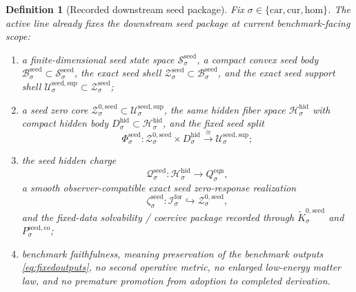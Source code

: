 \documentclass[11pt]{article}
\newcommand{\Car}{\mathrm{car}}
\newcommand{\Cur}{\mathrm{cur}}
\newcommand{\Hom}{\mathrm{hom}}
\newcommand{\ForSpace}[1]{\mathcal I_{#1}^{\mathrm{for}}}
\newcommand{\EqnTarget}[1]{Q_{#1}^{\mathrm{eqn}}}
\newcommand{\HiddenSpace}[1]{\mathcal H_{#1}^{\mathrm{hid}}}
\newcommand{\HiddenBody}[1]{D_{#1}^{\mathrm{hid}}}
\newcommand{\SeedState}[1]{\mathcal S_{#1}^{\mathrm{seed}}}
\newcommand{\SeedBody}[1]{\mathcal B_{#1}^{\mathrm{seed}}}
\newcommand{\SeedShell}[1]{\mathcal Z_{#1}^{\mathrm{seed}}}
\newcommand{\SeedSupportShell}[1]{\mathcal U_{#1}^{\mathrm{seed,sup}}}
\newcommand{\SeedZeroCore}[1]{\mathcal Z_{#1}^{0,\mathrm{seed}}}
\newcommand{\SeedSplit}[1]{\Phi_{#1}^{\mathrm{seed}}}
\newcommand{\SeedCharge}[1]{\mathcal Q_{#1}^{\mathrm{seed}}}
\newcommand{\SeedEmbed}[1]{\zeta_{#1}^{\mathrm{seed}}}
\newcommand{\SeedKernel}[1]{\widetilde K_{#1}^{0,\mathrm{seed}}}
\newcommand{\SeedCoercive}[1]{P_{#1}^{\mathrm{seed,co}}}
\newtheorem{definition}{Definition}
\begin{document}
\begin{definition}[Recorded downstream seed package]
\label{def:seed}
Fix \(\sigma\in\{\Car,\Cur,\Hom\}\). The active line already fixes the downstream seed package at current benchmark-facing scope:
\begin{enumerate}
    \item a finite-dimensional seed state space \(\SeedState{\sigma}\), a compact convex seed body \(\SeedBody{\sigma}\subset\SeedState{\sigma}\), the exact seed shell \(\SeedShell{\sigma}\subset\SeedBody{\sigma}\), and the exact seed support shell \(\SeedSupportShell{\sigma}\subset\SeedShell{\sigma}\);
    \item a seed zero core \(\SeedZeroCore{\sigma}\subset\SeedSupportShell{\sigma}\), the same hidden fiber space \(\HiddenSpace{\sigma}\) with compact hidden body \(\HiddenBody{\sigma}\subset\HiddenSpace{\sigma}\), and the fixed seed split
    \[
    \SeedSplit{\sigma}:
    \SeedZeroCore{\sigma}\times\HiddenBody{\sigma}
    \xrightarrow{\cong}
    \SeedSupportShell{\sigma};
    \]
    \item the seed hidden charge
    \[
    \SeedCharge{\sigma}:\HiddenSpace{\sigma}\to\EqnTarget{\sigma},
    \]
    a smooth observer-compatible exact seed zero-response realization
    \[
    \SeedEmbed{\sigma}:\ForSpace{\sigma}\hookrightarrow\SeedZeroCore{\sigma},
    \]
    and the fixed-data solvability / coercive package recorded through \(\SeedKernel{\sigma}\) and \(\SeedCoercive{\sigma}\);
    \item benchmark faithfulness, meaning preservation of the benchmark outputs \eqref{eq:fixedoutputs}, no second operative metric, no enlarged low-energy matter law, and no premature promotion from adoption to completed derivation.
\end{enumerate}
\end{definition}
\end{document}
